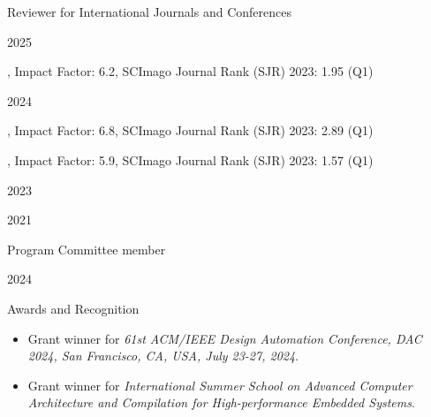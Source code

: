 \documentclass[
	a4paper, %
	10pt, %
]{tresume} %
\begin{document}
%
\begin{tSection}{Reviewer for International Journals and Conferences}
  \begin{tSubsection}{2025}{}{}{}
  \item {}, Impact Factor: 6.2, SCImago Journal Rank (SJR) 2023: 1.95 (Q1)
  \end{tSubsection}
  \begin{tSubsection}{2024}{}{}{}
  \item {}
  \item {}, Impact Factor: 6.8, SCImago Journal Rank (SJR) 2023: 2.89 (Q1)
  \item {}, Impact Factor: 5.9, SCImago Journal Rank (SJR) 2023: 1.57 (Q1)
  \end{tSubsection}
  \begin{tSubsection}{2023}{}{}{}
  \item {}
  \item {}
  \end{tSubsection}
  \begin{tSubsection}{2021}{}{}{}
  \item {}
  \end{tSubsection}
\end{tSection}
%
\begin{tSection}{Program Committee member}
  \begin{tSubsection}{2024}{}{}{}
    \item {}
\end{tSubsection}
\end{tSection}
%
\begin{tSection}{Awards and Recognition}
  \begin{itemize}
  \item[2024] Grant winner for \emph{61st ACM/IEEE Design Automation
      Conference, DAC 2024, San Francisco, CA, USA, July 23-27,
      2024}.
  \item[2021] Grant winner for \emph{International Summer School on Advanced
      Computer Architecture and Compilation for High-performance Embedded
      Systems}.
  \end{itemize}
\end{tSection}
\end{document}
